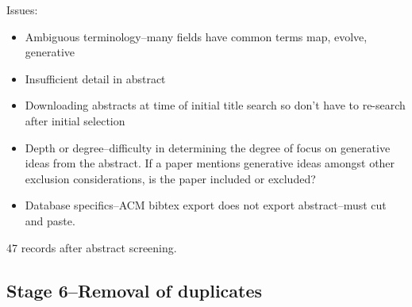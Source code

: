 Issues:
\begin{itemize}
	\item Ambiguous terminology--many fields have common terms \eg map, evolve, generative
	\item Insufficient detail in abstract
	\item Downloading abstracts at time of initial title search so don't have to re-search after initial selection
	\item Depth or degree--difficulty in determining the degree of focus on generative ideas from the abstract. If a paper mentions generative ideas amongst other exclusion considerations, is the paper included or excluded?
	\item Database specifics--ACM bibtex export does not export abstract--must cut and paste. 
\end{itemize}

47 records after abstract screening.

\subsection{Stage 6--Removal of duplicates}

